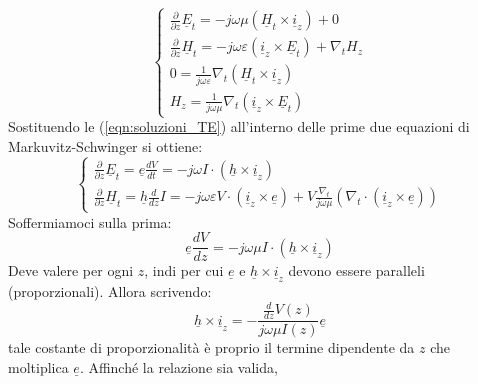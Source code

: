 \documentclass{book}
\begin{document}
            \begin{equation}
                \begin{cases}
                    \displaystyle \frac{\partial}{\partial z} \underline{E}_{t} = -j \omega \mu (\underline{H}_{t} \times \underline{i}_{z})+0 \\
                    \displaystyle \frac{\partial}{\partial z} \underline{H}_{t} = -j \omega \varepsilon (\underline{i}_{z} \times \underline{E}_{t})+\nabla_{t}H_{z} \\
                    0 =\frac{1}{j\omega \varepsilon}\nabla_{t}(\underline{H}_{t}\times \underline{i}_{z}) \\
                    \displaystyle H_{z} = \frac{1}{j \omega \mu} \nabla_{t}(\underline{i}_{z}\times \underline{E}_{t})    
                \end{cases}
            \end{equation}
        Sostituendo le (\ref{eqn:soluzioni_TE}) all'interno delle prime due equazioni di Markuvitz-Schwinger si ottiene:
        \begin{equation}
            \begin{cases}
                \displaystyle \frac{\partial}{\partial z}\underline{E}_{t} = \underline{e}\frac{dV}{dt} = -j \omega I \cdot (\underline{h} \times \underline{i}_{z}) \\
                \displaystyle \frac{\partial}{\partial z} \underline{H}_{t} = \underline{h}\frac{d}{dz}I = -j \omega \varepsilon  V \cdot (\underline{i}_{z} \times \underline{e})+V \frac{\nabla_{t}}{j \omega \mu} (\nabla_{t} \cdot (\underline{i}_{z} \times \underline{e}))    
            \end{cases}
        \end{equation}
        Soffermiamoci sulla prima:
        \begin{equation}
            \underline{e}\frac{dV}{dz} = -j \omega \mu I \cdot (\underline{h} \times \underline{i}_{z})
        \end{equation}
        Deve valere per ogni $z$, indi per cui $\underline{e}$ e $\underline{h} \times \underline{i}_{z}$ devono essere 
        paralleli (proporzionali). Allora scrivendo:
        \begin{equation}
            \underline{h} \times \underline{i}_{z} = \displaystyle -\frac{\frac{d}{dz}V(z)}{j \omega \mu I(z)} \underline{e}
        \end{equation}
        tale costante di proporzionalità è proprio il termine dipendente da $z$ che moltiplica $\underline{e}$. Affinché la relazione sia valida,
\end{document}
